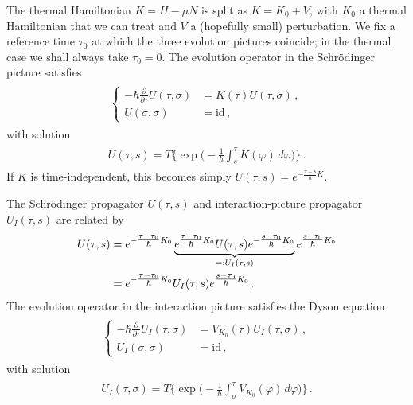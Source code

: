 \documentclass[../QFT_main.tex]{subfiles}
\begin{document}
\begin{mytheorem}
The thermal Hamiltonian $K=H-\mu N$ is split as $K=K_0+V$, with $K_0$ a thermal Hamiltonian that we can treat and $V$ a (hopefully small) perturbation.
We fix a reference time $\tau_0$ at which the three evolution pictures coincide; in the thermal case we shall always take $\tau_0=0$.
The evolution operator in the Schr\"odinger picture satisfies
{\small\begin{align}\begin{aligned}
    \left\{
    \begin{aligned}
        -\hbar\tfrac{\partial}{\partial\tau}U(\tau,\sigma)&=K(\tau)U(\tau,\sigma)\,,
        \\
        U(\sigma,\sigma)&=\mathrm{id}\,,
    \end{aligned}
    \right.
\end{aligned}\end{align}}
with solution
{\small\begin{align}\begin{aligned}
    U(\tau,s)
    =
    T\Big\{
        \exp\big(-\tfrac{1}{\hbar}\int_s^\tau K(\varphi)\,d\varphi\big)
    \Big\}\,.
\end{aligned}\end{align}}
If $K$ is time-independent, this becomes simply $U(\tau,s)=e^{-\tfrac{\tau-s}{\hbar}K}$.

The Schr\"odinger propagator $U(\tau,s)$ and interaction-picture propagator $U_I(\tau,s)$ are related by
{\small\begin{align}\begin{aligned}
    U(\tau,s)
    &=
    e^{-\tfrac{\tau-\tau_0}{\hbar}K_0}
    \underbrace{
        e^{\tfrac{\tau-\tau_0}{\hbar}K_0}
        U(\tau,s)
        e^{-\tfrac{s-\tau_0}{\hbar}K_0}
    }_{=:U_I(\tau,s)}
    e^{\tfrac{s-\tau_0}{\hbar}K_0}
    \notag\\
    &=
    e^{-\tfrac{\tau-\tau_0}{\hbar}K_0}
    U_I(\tau,s)
    e^{\tfrac{s-\tau_0}{\hbar}K_0}\,.
\end{aligned}\end{align}}
The evolution operator in the interaction picture satisfies the Dyson equation
{\small\begin{align}\begin{aligned}
    \left\{
    \begin{aligned}
        -\hbar\tfrac{\partial}{\partial\tau}U_I(\tau,\sigma)
        &=V_{K_0}(\tau)U_I(\tau,\sigma)\,,
        \\
        U_I(\sigma,\sigma)&=\mathrm{id}\,,
    \end{aligned}
    \right.
\end{aligned}\end{align}}
with solution
{\small\begin{align}\begin{aligned}
    U_I(\tau,\sigma)
    =
    T\Big\{
        \exp\big(-\tfrac{1}{\hbar}\int_\sigma^\tau V_{K_0}(\varphi)\,d\varphi\big)
    \Big\}\,.
\end{aligned}\end{align}}


\end{mytheorem}
\end{document}

